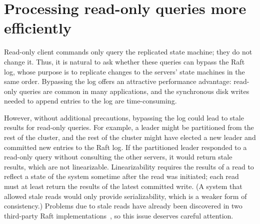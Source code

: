 \section{Processing read-only queries more efficiently}
\label{clients:readonly}

Read-only client commands only query the replicated state machine; they
do not change it. Thus, it is natural to ask whether these queries can
bypass the Raft log, whose purpose is to replicate changes to the
servers' state machines in the same order. Bypassing the log offers an
attractive performance advantage: read-only queries are common in many
applications, and the synchronous disk writes needed to append entries
to the log are time-consuming.

However, without additional precautions, bypassing the log could lead to
stale results for read-only queries.
For example, a leader might be partitioned from the rest of the
cluster, and the rest of the cluster might have elected a new leader and
committed new entries to the Raft log. If the partitioned leader
responded to a read-only query without consulting the other servers,
it would return stale results, which are not linearizable.
Linearizability requires the results of a read to reflect a state of the
system sometime after the read was initiated; each read must at least
return the results of the latest committed write.
(A system that allowed stale reads would only provide
serializability, which is a weaker form of consistency.)
Problems due to stale reads have already been discovered in two
third-party Raft implementations~\cite{Kingsbury:etcdconsul},
so this issue deserves careful attention.


